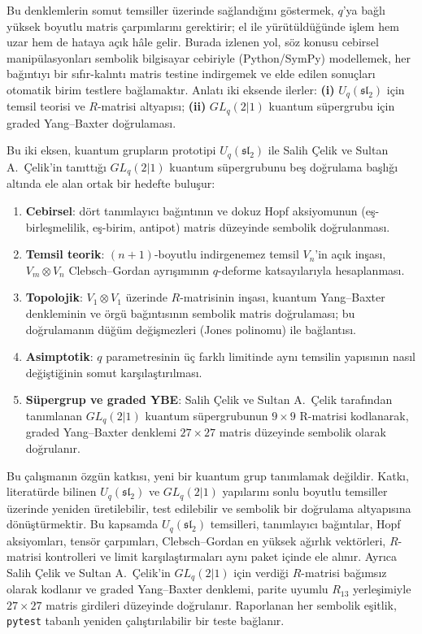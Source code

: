 \documentclass[10pt]{math}
\numberwithin{equation}{section}
\theoremstyle{plain}
\theoremstyle{definition}
\renewcommand{\sl}{\mathfrak{sl}}
\newcommand{\Uq}{U_q(\sl_2)}
\begin{document}
Bu denklemlerin somut temsiller üzerinde sağlandığını göstermek, $q$'ya bağlı
yüksek boyutlu matris çarpımlarını gerektirir; el ile yürütüldüğünde işlem hem
uzar hem de hataya açık hâle gelir. Burada izlenen yol, söz konusu cebirsel
manipülasyonları sembolik bilgisayar cebiriyle (Python/SymPy) modellemek, her
bağıntıyı bir sıfır-kalıntı matris testine indirgemek ve elde edilen sonuçları
otomatik birim testlere bağlamaktır. Anlatı iki eksende ilerler: \textbf{(i)}
$\Uq$ için temsil teorisi ve $R$-matrisi altyapısı; \textbf{(ii)} $GL_q(2|1)$
kuantum süpergrubu için graded Yang--Baxter doğrulaması.

Bu iki eksen, kuantum grupların prototipi $\Uq$ ile Salih Çelik ve Sultan A.\ Çelik'in tanıttığı
$GL_q(2|1)$ kuantum süpergrubunu beş doğrulama başlığı altında ele alan ortak bir
hedefte buluşur:
\begin{enumerate}[leftmargin=*]
  \item \textbf{Cebirsel}: dört tanımlayıcı bağıntının ve dokuz Hopf
        aksiyomunun (eş-birleşmelilik, eş-birim, antipot) matris düzeyinde
        sembolik doğrulanması.
  \item \textbf{Temsil teorik}: $(n+1)$-boyutlu indirgenemez temsil $V_n$'in
        açık inşası, $V_m \otimes V_n$ Clebsch--Gordan ayrışımının $q$-deforme
        katsayılarıyla hesaplanması.
  \item \textbf{Topolojik}: $V_1\otimes V_1$ üzerinde $R$-matrisinin
        inşası, kuantum Yang--Baxter denkleminin ve örgü bağıntısının
        sembolik matris doğrulaması; bu doğrulamanın düğüm değişmezleri (Jones
        polinomu) ile bağlantısı.
  \item \textbf{Asimptotik}: $q$ parametresinin üç farklı limitinde aynı
        temsilin yapısının nasıl değiştiğinin somut karşılaştırılması.
  \item \textbf{Süpergrup ve graded YBE}: Salih Çelik ve Sultan A.\ Çelik tarafından tanımlanan
        $GL_q(2|1)$ kuantum süpergrubunun $9\times 9$ R-matrisi kodlanarak,
        graded Yang--Baxter denklemi $27\times 27$ matris düzeyinde sembolik
        olarak doğrulanır.
\end{enumerate}

Bu çalışmanın özgün katkısı, yeni bir kuantum grup tanımlamak değildir.
Katkı, literatürde bilinen $\Uq$ ve $GL_q(2|1)$ yapılarını sonlu boyutlu
temsiller üzerinde yeniden üretilebilir, test edilebilir ve sembolik bir
doğrulama altyapısına dönüştürmektir. Bu kapsamda $\Uq$ temsilleri, tanımlayıcı
bağıntılar, Hopf aksiyomları, tensör çarpımları, Clebsch--Gordan en yüksek
ağırlık vektörleri, $R$-matrisi kontrolleri ve limit karşılaştırmaları aynı
paket içinde ele alınır. Ayrıca Salih Çelik ve Sultan A.\ Çelik'in
$GL_q(2|1)$ için verdiği $R$-matrisi bağımsız olarak kodlanır ve graded
Yang--Baxter denklemi, parite uyumlu $R_{13}$ yerleşimiyle $27\times 27$
matris girdileri düzeyinde doğrulanır. Raporlanan her sembolik eşitlik,
\texttt{pytest} tabanlı yeniden çalıştırılabilir bir teste bağlanır.
\end{document}
